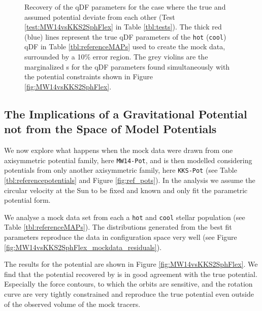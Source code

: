 \begin{figure}[!htb]
\caption{Recovery of the qDF parameters for the case where the true and assumed potential deviate from each other (Test \ref{test:MW14vsKKS2SphFlex} in Table \ref{tbl:tests}). The thick red (blue) lines represent the true qDF parameters of the \texttt{hot} (\texttt{cool}) qDF in Table \ref{tbl:referenceMAPs} used to create the mock data, surrounded by a 10\% error region. The grey violins are the marginalized \pdf{}s for the qDF parameters found simultaneously with the potential constraints shown in Figure \ref{fig:MW14vsKKS2SphFlex}.}
\label{fig:MW14vsKKS2SphFlex_violins}
\end{figure}





\subsection{The Implications of a Gravitational Potential not from the Space of Model Potentials} \label{sec:results_potential}


We now explore what happens when the mock data were drawn from one axisymmetric potential family, here \texttt{MW14-Pot}, and is then modelled considering potentials from only another axisymmetric family, here \texttt{KKS-Pot} (see Table \ref{tbl:referencepotentials} and Figure \ref{fig:ref_pots}). In the analysis we assume the circular velocity at the Sun to be fixed and known  and only fit the parametric potential form. 





We analyse a mock data set from each a \texttt{hot} and \texttt{cool} stellar population (see Table \ref{tbl:referenceMAPs}). The distributions generated from the best fit parameters reproduce the data in configuration space very well (see Figure \ref{fig:MW14vsKKS2SphFlex_mockdata_residuals}).

The results for the potential are shown in Figure \ref{fig:MW14vsKKS2SphFlex}. We find that the potential recovered by \RM{} is in good agreement with the true potential. Especially the force contours, to which the orbits are sensitive, and the rotation curve are very tightly constrained and reproduce the true potential even outside of the observed volume of the mock tracers.

